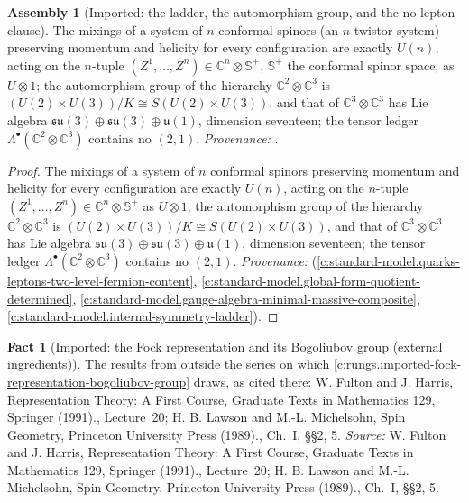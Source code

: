 \documentclass[11pt]{article}
\theoremstyle{definition}
\newtheorem{fact}[theorem]{Fact}
\newtheorem{assembled}[theorem]{Assembly}
\theoremstyle{plain}
\providecommand{\C}{}\renewcommand{\C}{\mathbb{C}}
\providecommand{\CS}{}\renewcommand{\CS}{{\mathbb{S}^{+}}}
\providecommand{\su}{}\renewcommand{\su}{\mathfrak{su}}
\providecommand{\uu}{}\renewcommand{\uu}{\mathfrak{u}}
\begin{document}
\begin{assembled}[Imported: the ladder, the automorphism group, and the no-lepton clause]\label{c:rungs.imported-ladder-automorphism-group-no-lepton}
The mixings of a system of $n$ conformal spinors (an $n$-twistor system) preserving momentum and helicity for every configuration are exactly $U(n)$, acting on the $n$-tuple $(Z^{1}, \ldots, Z^{n}) \in \C^{n} \otimes \CS$, $\CS$ the conformal spinor space, as $U \otimes 1$; the automorphism group of the hierarchy $\C^{2} \otimes \C^{3}$ is $(U(2) \times U(3))/K \cong S(U(2) \times U(3))$, and that of $\C^{3} \otimes \C^{3}$ has Lie algebra $\su(3) \oplus \su(3) \oplus \uu(1)$, dimension seventeen; the tensor ledger $\Lambda^{\bullet}(\C^{2} \otimes \C^{3})$ contains no $(2,1)$. \emph{Provenance:} \cite[Prop.~3.1, Thms.~4.1, 4.2, Prop.~5.3(2)]{ButlerT12}.
\end{assembled}
\begin{proof}
The mixings of a system of $n$ conformal spinors preserving momentum and helicity for every configuration are exactly $U(n)$, acting on the $n$-tuple $(Z^{1}, \ldots, Z^{n}) \in \C^{n} \otimes \CS$ as $U \otimes 1$; the automorphism group of the hierarchy $\C^{2} \otimes \C^{3}$ is $(U(2) \times U(3))/K \cong S(U(2) \times U(3))$, and that of $\C^{3} \otimes \C^{3}$ has Lie algebra $\su(3) \oplus \su(3) \oplus \uu(1)$, dimension seventeen; the tensor ledger $\Lambda^{\bullet}(\C^{2} \otimes \C^{3})$ contains no $(2,1)$. \emph{Provenance:} \cite[Prop.~3.1, Thms.~4.1, 4.2, Prop.~5.3(2)]{ButlerT12} (\ref{c:standard-model.quarks-leptons-two-level-fermion-content}, \ref{c:standard-model.global-form-quotient-determined}, \ref{c:standard-model.gauge-algebra-minimal-massive-composite}, \ref{c:standard-model.internal-symmetry-ladder}).

\end{proof}

\begin{fact}[Imported: the Fock representation and its Bogoliubov group (external ingredients)]\label{c:rungs.imported-fock-representation-bogoliubov-group-external}
The results from outside the series on which \ref{c:rungs.imported-fock-representation-bogoliubov-group} draws, as cited there: W. Fulton and J. Harris, Representation Theory: A First Course, Graduate Texts in Mathematics 129, Springer (1991)., Lecture~20; H. B. Lawson and M.-L. Michelsohn, Spin Geometry, Princeton University Press (1989)., Ch.~I, \S\S 2, 5.
\emph{Source:} W. Fulton and J. Harris, Representation Theory: A First Course, Graduate Texts in Mathematics 129, Springer (1991)., Lecture~20; H. B. Lawson and M.-L. Michelsohn, Spin Geometry, Princeton University Press (1989)., Ch.~I, \S\S 2, 5.
\end{fact}
\end{document}
